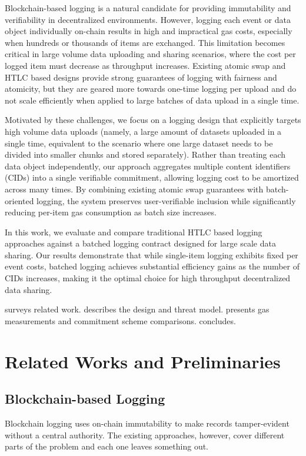 \documentclass{svproc}
\begin{document}
Blockchain-based logging is a natural candidate for providing immutability and verifiability in decentralized environments. However, logging each event or data object individually on-chain results in high and impractical gas costs, especially when hundreds or thousands of items are exchanged. This limitation becomes critical in large volume data uploading and sharing scenarios, where the cost per logged item must decrease as throughput increases. Existing atomic swap and HTLC based designs provide strong guarantees of logging with fairness and atomicity, but they are geared more towards one-time logging per upload and do not scale efficiently when applied to large batches of data upload in a single time.

Motivated by these challenges, we focus on a logging design that explicitly targets high volume data uploads (namely, a large amount of datasets uploaded in a single time, equivalent to the scenario where one large dataset needs to be divided into smaller chunks and stored separately). Rather than treating each data object independently, our approach aggregates multiple content identifiers (CIDs) into a single verifiable commitment, allowing logging cost to be amortized across many times. By combining existing atomic swap guarantees with batch-oriented logging, the system preserves user-verifiable inclusion while significantly reducing per-item gas consumption as batch size increases.

In this work, we evaluate and compare traditional HTLC based logging approaches against a batched logging contract designed for large scale data sharing. Our results demonstrate that while single-item logging exhibits fixed per event costs, batched logging achieves substantial efficiency gains as the number of CIDs increases, making it the optimal choice for high throughput decentralized data sharing.

 surveys related work.  describes the design and threat model.  presents gas measurements and commitment scheme comparisons.  concludes.





\section{Related Works and Preliminaries}
\label{sec:related}

\subsection{Blockchain-based Logging}
Blockchain logging uses on-chain immutability to make records tamper-evident without a central authority. The existing approaches, however, cover different parts of the problem and each one leaves something out.
\end{document}
